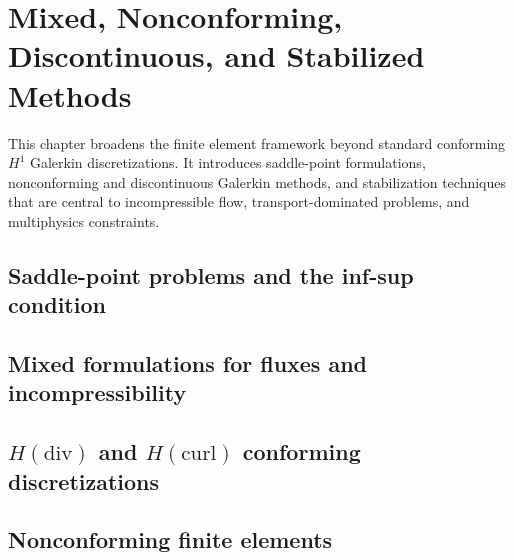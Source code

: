 \chapter[Mixed, Nonconforming, DG, and Stabilized Methods]{Mixed, Nonconforming, Discontinuous, and Stabilized Methods}
\label{ch:advanced_methods}

This chapter broadens the finite element framework beyond standard conforming
$H^1$ Galerkin discretizations. It introduces saddle-point formulations,
nonconforming and discontinuous Galerkin methods, and stabilization techniques
that are central to incompressible flow, transport-dominated problems, and
multiphysics constraints.

\section{Saddle-point problems and the inf-sup condition}
\label{sec:advanced_methods:infsup}


\section{Mixed formulations for fluxes and incompressibility}
\label{sec:advanced_methods:mixed}


\section{\texorpdfstring{$H(\mathrm{div})$ and $H(\mathrm{curl})$ conforming discretizations}{H(div) and H(curl) conforming discretizations}}
\label{sec:advanced_methods:compatible_spaces}


\section{Nonconforming finite elements}
\label{sec:advanced_methods:nonconforming}


